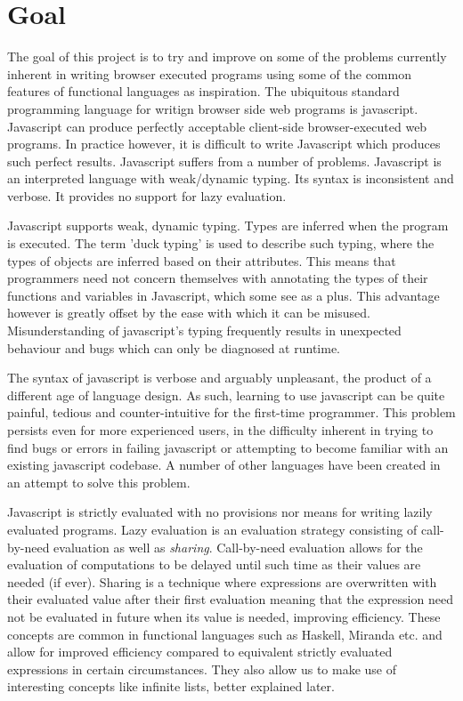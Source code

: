
\section*{Goal}
The goal of this project is to try and improve on some of the problems currently 
inherent in writing browser executed programs using some of the common features
of functional languages as inspiration. The ubiquitous standard programming 
language for writign browser side web programs is javascript. Javascript can produce 
perfectly acceptable client-side browser-executed
web programs. In practice however, it is difficult to write Javascript which produces 
such perfect results. Javascript suffers from a number of problems. Javascript is an
interpreted language with weak/dynamic typing. Its syntax is inconsistent and verbose.
It provides no support for lazy evaluation.


Javascript supports weak, dynamic typing. Types are inferred when the program is
executed. The term 'duck typing' is used to describe such typing, where the types
of objects are inferred based on their attributes. This means that programmers need
not concern themselves with annotating the types of their functions and variables in
Javascript, which some see as a plus. This advantage however is greatly offset by
the ease with which it can be misused. Misunderstanding of javascript's typing 
frequently results in unexpected behaviour and bugs which can only be diagnosed at
runtime. 

The syntax of javascript is verbose and arguably unpleasant, the product of a different
age of language design. As such, learning to use javascript can be quite painful, tedious
and counter-intuitive for the first-time programmer. This problem persists even for
more experienced users, in the difficulty inherent in trying to find bugs or errors in
failing javascript or attempting to become familiar with an existing javascript codebase.
A number of other languages have been created in an attempt to solve this problem.

Javascript is strictly evaluated with no provisions nor means for writing lazily evaluated
programs. Lazy evaluation is an evaluation strategy consisting of call-by-need evaluation
as well as \emph{sharing}. Call-by-need evaluation allows for the evaluation of
computations to be delayed until such time as their values are needed (if ever). Sharing
is a technique where expressions are overwritten with their evaluated value after their
first evaluation meaning that the expression need not be evaluated in future when its
value is needed, improving efficiency. These concepts are common in functional languages
such as Haskell, Miranda etc. and allow for improved efficiency compared to equivalent
strictly evaluated expressions in certain circumstances. They also allow us to make use
of interesting concepts like infinite lists, better explained later.


